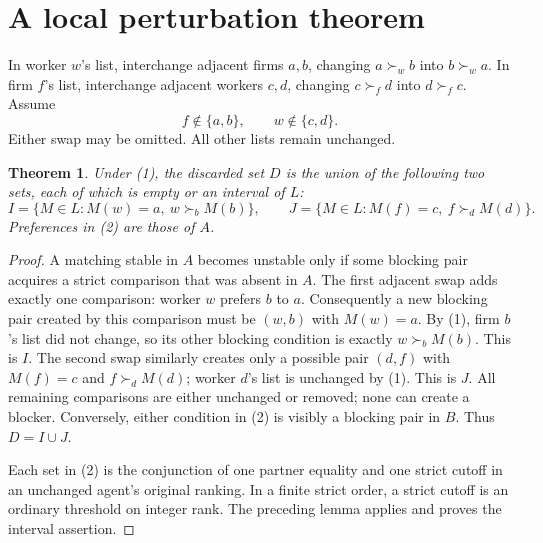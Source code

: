 \documentclass[11pt]{article}
\newtheorem{theorem}{Theorem}
\theoremstyle{definition}
\begin{document}
\section*{A local perturbation theorem}
In worker $w$'s list, interchange adjacent firms $a,b$, changing
$a\succ_w b$ into $b\succ_w a$. In firm $f$'s list, interchange adjacent
workers $c,d$, changing $c\succ_f d$ into $d\succ_f c$.
Assume
\[
 f\notin\{a,b\},\qquad w\notin\{c,d\}.                 \tag{1}
\]
Either swap may be omitted. All other lists remain unchanged.

\begin{theorem}
Under (1), the discarded set $D$ is the union of the following two sets,
each of which is empty or an interval of $L$:
\[
 I=\{M\in L:M(w)=a,\ w\succ_b M(b)\},\qquad
 J=\{M\in L:M(f)=c,\ f\succ_d M(d)\}.                  \tag{2}
\]
Preferences in (2) are those of $A$.
\end{theorem}
\begin{proof}
A matching stable in $A$ becomes unstable only if some blocking pair
acquires a strict comparison that was absent in $A$. The first adjacent
swap adds exactly one comparison: worker $w$ prefers $b$ to $a$.
Consequently a new blocking pair created by this comparison must be
$(w,b)$ with $M(w)=a$. By (1), firm $b$'s list did not change, so its
other blocking condition is exactly $w\succ_b M(b)$. This is $I$.
The second swap similarly creates only a possible pair $(d,f)$ with
$M(f)=c$ and $f\succ_d M(d)$; worker $d$'s list is unchanged by (1).
This is $J$. All remaining comparisons are either unchanged or removed;
none can create a blocker. Conversely, either condition in (2) is visibly
a blocking pair in $B$. Thus $D=I\cup J$.

Each set in (2) is the conjunction of one partner equality and one strict
cutoff in an unchanged agent's original ranking. In a finite strict order,
a strict cutoff is an ordinary threshold on integer rank. The preceding
lemma applies and proves the interval assertion.
\end{proof}
\end{document}
